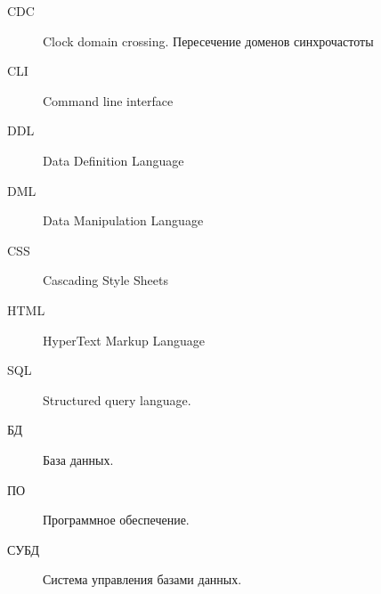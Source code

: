 \Abbreviations %
\begin{description}
\item [CDC] Clock domain crossing. Пересечение доменов синхрочастоты
\item [CLI] Command line interface
\item [DDL] Data Definition Language
\item [DML] Data Manipulation Language
\item [CSS] Cascading Style Sheets
\item [HTML] HyperText Markup Language
\item[SQL] Structured query language.
\item[БД] База данных.
\item[ПО] Программное обеспечение.
\item[СУБД] Система управления базами данных.

\end{description}

